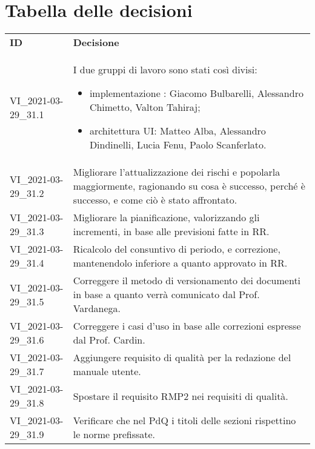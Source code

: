 \documentclass[]{article}
\begin{document}
	\newpage

	\section{Tabella delle decisioni}

	\begin{table} [h!]
		\begin{center}
			\begin{tabular} { m{2cm} m{14cm} }
				\rowcolor{lightgray}
				\textbf{ID} & \textbf{Decisione}\\
				VI\_2021-03-29\_31.1 & I due gruppi di lavoro sono stati così divisi:
				 \begin{itemize}
					\item implementazione \glock{WebSocket}: Giacomo Bulbarelli, Alessandro Chimetto, Valton Tahiraj;
					\item architettura UI: Matteo Alba, Alessandro Dindinelli, Lucia Fenu, Paolo Scanferlato.
				\end{itemize}\\
				VI\_2021-03-29\_31.2 & Migliorare l'attualizzazione dei rischi e popolarla maggiormente, ragionando su cosa è successo, perché è successo, e come ciò è stato affrontato. \\
				VI\_2021-03-29\_31.3 & Migliorare la pianificazione, valorizzando gli incrementi, in base alle previsioni fatte in RR. \\
				VI\_2021-03-29\_31.4 & Ricalcolo del consuntivo di periodo, e correzione, mantenendolo inferiore a quanto approvato in RR. \\
				VI\_2021-03-29\_31.5 & Correggere il metodo di versionamento dei documenti in base a quanto verrà comunicato dal Prof. Vardanega. \\
				VI\_2021-03-29\_31.6 & Correggere i casi d'uso in base alle correzioni espresse dal Prof. Cardin. \\
				VI\_2021-03-29\_31.7 & Aggiungere requisito di qualità per la redazione del manuale utente. \\
				VI\_2021-03-29\_31.8 & Spostare il requisito RMP2 nei requisiti di qualità. \\
				VI\_2021-03-29\_31.9 & Verificare che nel PdQ i titoli delle sezioni rispettino le norme prefissate. \\
			\end{tabular}
		\end{center}
	\end{table}
\end{document}
